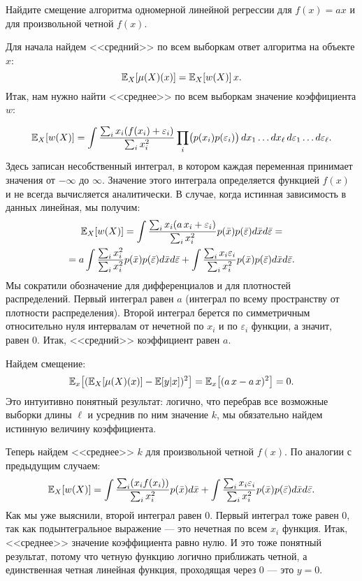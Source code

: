 \documentclass[12pt,fleqn]{article}
\begin{document}
\begin{vkProblem}
    Найдите смещение алгоритма одномерной линейной регрессии для $f(x) = ax$ и для произвольной четной $f(x)$. 
\end{vkProblem}
\begin{esSolution}
    Для начала найдем <<средний>> по всем выборкам ответ алгоритма на объекте $x$:
    \[
    \mathbb{E}_{X}[\mu(X)(x)] = \mathbb{E}_{X}[w(X)] \, x.
    \]
    Итак, нам нужно найти <<среднее>> по всем выборкам значение коэффициента $w$:
    
    \begin{equation}
    \label{k_eq}
    \mathbb{E}_{X}[w(X)] = \int \frac{\sum_i x_i (f(x_i)+\varepsilon_i)}{\sum_i x_i^2} \prod_i \bigl( p(x_i) p(\varepsilon_i) \bigr) \, dx_1 \dots dx_\ell \, d\varepsilon_1 \dots d\varepsilon_\ell.
    \end{equation}
    Здесь записан несобственный интеграл, в котором каждая переменная принимает значения от $-\infty$ до $\infty$. Значение этого интеграла определяется функцией $f(x)$ и не всегда вычисляется аналитически. В случае, когда истинная зависимость в данных линейная, мы получим:
    \begin{multline*}
    \mathbb{E}_{X}[w(X)] =  \int \frac{\sum_i x_i (a\,x_i+\varepsilon_i)}{\sum_i x_i^2}  p(\bar x) p(\bar \varepsilon)  d \bar x d \bar \varepsilon = \\ = a \int \frac{\sum_i x_i^2}{\sum_i x_i^2}  p(\bar x)  p(\bar \varepsilon)  d \bar x d \bar \varepsilon +
    \int \frac{\sum_i x_i \varepsilon_i}{\sum_i x_i^2}  p(\bar x)  p(\bar \varepsilon)  d \bar x d \bar \varepsilon.
    \end{multline*}
    Мы сократили обозначение для дифференциалов и для плотностей распределений. Первый интеграл равен $a$ (интеграл по всему пространству от плотности распределения). Второй интеграл берется по симметричным относительно нуля интервалам от нечетной по $x_i$ и по $\varepsilon_i$ функции, а значит, равен 0. Итак, <<средний>> коэффициент равен $a$.
        
    Найдем смещение:
    \[
    \mathbb{E}_{x}\bigl[(\mathbb{E}_{X}[\mu(X)(x)] - \mathbb{E}[y|x] )^2\bigr] = \mathbb{E}_{x}\bigl[(a\,x -  a\, x )^2\bigr] = 0.
    \]
    Это интуитивно понятный результат: логично, что перебрав все возможные выборки длины $\ell$ и усреднив по ним значение $k$, мы обязательно найдем истинную величину коэффициента.
    
    Теперь найдем <<среднее>> $k$ для произвольной четной  $f(x)$. По аналогии с предыдущим случаем:
    \[
    \mathbb{E}_{X}[w(X)] = 
    \int \frac{\sum_i ( x_i f(x_i)) }{\sum_i x_i^2}  p(\bar x)  d\bar x  +
    \int \frac{\sum_i x_i \varepsilon_i}{\sum_i x_i^2}  p(\bar x)  p(\bar \varepsilon)  d \bar x d \bar \varepsilon.
    \]  
    Как мы уже выяснили, второй интеграл равен 0. Первый интеграл тоже равен 0, так как подынтегральное выражение --- это нечетная по всем $x_i$ функция. Итак, <<среднее>> значение коэффициента равно нулю. И это тоже понятный результат, потому что четную функцию логично приближать четной, а единственная четная линейная функция, проходящая через 0 --- это $y = 0$.
    

\end{esSolution}
\end{document}
